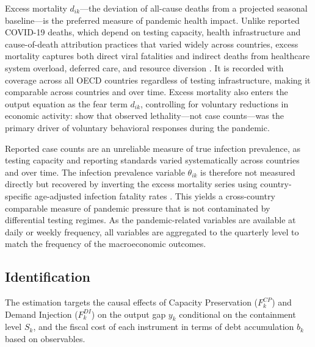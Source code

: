 \documentclass[12pt, a4paper]{article}
\begin{document}
\noindent Excess mortality $d_{ik}$---the deviation of all-cause deaths from a
projected seasonal baseline---is the preferred measure of pandemic health impact.
Unlike reported COVID-19 deaths, which depend on testing capacity, health
infrastructure and cause-of-death attribution practices that varied widely across
countries, excess mortality captures both direct viral fatalities and indirect
deaths from healthcare system overload, deferred care, and resource diversion
\citep{Msemburi2023WHO}. It is recorded with coverage across all OECD countries regardless of testing infrastructure, making it comparable across countries and over time. Excess mortality also enters the output equation as the fear term $d_{ik}$, controlling for voluntary reductions in economic activity: \citet{GOOLSBEE2021} show that observed lethality---not case counts---was the primary driver of voluntary behavioral responses during the pandemic.

Reported case counts are an unreliable measure of true infection prevalence, as
testing capacity and reporting standards varied systematically across countries
and over time. The infection prevalence variable $\theta_{ik}$ is therefore not
measured directly but recovered by inverting the excess mortality series using
country-specific age-adjusted infection fatality rates
\citep{Levin2020, COVID19ForecastingTeam2022}. This yields a cross-country
comparable measure of pandemic pressure that is not contaminated by differential
testing regimes. As the pandemic-related variables are available at daily or weekly frequency, all variables are aggregated to the quarterly level to match the frequency of the macroeconomic outcomes.


\subsection{Identification}
\label{subsec:identification}


The estimation targets the causal effects of Capacity Preservation ($F_k^{CP}$) and Demand Injection ($F_k^{DI}$) on the output gap $y_k$ conditional on the containment level $S_k$, and the fiscal cost of each instrument in terms of debt accumulation $b_k$ based on observables.
\end{document}
